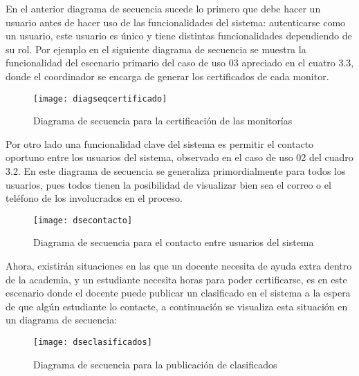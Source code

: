 En el anterior diagrama de secuencia sucede lo primero que debe hacer un usuario antes de hacer uso de las funcionalidades del sistema: autenticarse como un usuario, este usuario es único y tiene distintas funcionalidades dependiendo de su rol. 
\clearpage
Por ejemplo en el siguiente diagrama de secuencia se muestra la funcionalidad del escenario primario del caso de uso 03 apreciado en el cuatro 3.3, donde el coordinador se encarga de generar los certificados de cada monitor.

\begin{figure}[H]
	\centering
	\texttt{[image: diagseqcertificado]}
    \caption{Diagrama de secuencia para la certificación de las monitorías}
	\label{fig:dsecertificacion}
\end{figure}

Por otro lado una funcionalidad clave del sistema es permitir el contacto oportuno entre los usuarios del sistema, observado en el caso de uso 02 del cuadro 3.2. En este diagrama de secuencia se generaliza primordialmente para todos los usuarios, pues todos tienen la posibilidad de visualizar bien sea el correo o el teléfono de los involucrados en el proceso.
\begin{figure}[H]
	\centering
	\texttt{[image: dsecontacto]}
    \caption{Diagrama de secuencia para el contacto entre usuarios del sistema}
	\label{fig:dsecontacto}
\end{figure}

Ahora, existirán situaciones en las que un docente necesita de ayuda extra dentro de la academia, y un estudiante necesita horas para poder certificarse, es en este escenario donde el docente puede publicar un clasificado en el sistema a la espera de que algún estudiante lo contacte, a continuación se visualiza esta situación en un diagrama de secuencia: 
\begin{figure}[H]
	\centering
	\texttt{[image: dseclasificados]}
    \centering
    \caption{Diagrama de secuencia para la publicación de clasificados}
	\label{fig:dseclasificados}
\end{figure}

